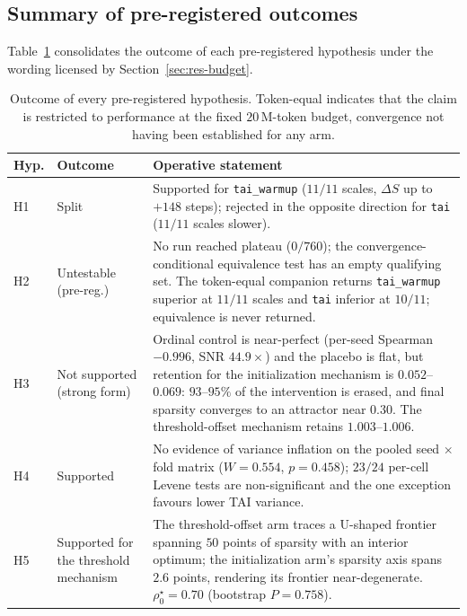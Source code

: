 \documentclass[final,5p,times,twocolumn]{elsarticle}
\theoremstyle{remark}
\newcommand{\rhoz}{\rho_{0}}
\newcommand{\dS}{\Delta S}
\begin{document}
\subsection{Summary of pre-registered outcomes}
\label{sec:res-summary}

Table~\ref{tab:hypsummary} consolidates the outcome of each pre-registered
hypothesis under the wording licensed by Section~\ref{sec:res-budget}.

\begin{table}[t]
\centering
\scriptsize
\caption{Outcome of every pre-registered hypothesis. Token-equal indicates
that the claim is restricted to performance at the fixed $20$\,M-token budget,
convergence not having been established for any arm.}
\label{tab:hypsummary}
\begin{tabular}{@{}p{0.9cm}p{2.7cm}p{6.1cm}@{}}
\toprule
Hyp. & Outcome & Operative statement \\
\midrule
H1 & Split &
Supported for \texttt{tai\_warmup} ($11/11$ scales, $\dS$ up to $+148$ steps);
rejected in the opposite direction for \texttt{tai} ($11/11$ scales slower). \\
\addlinespace
H2 & Untestable (pre-reg.) &
No run reached plateau ($0/760$); the convergence-conditional equivalence test
has an empty qualifying set. The token-equal companion returns
\texttt{tai\_warmup} superior at $11/11$ scales and \texttt{tai} inferior at
$10/11$; equivalence is never returned. \\
\addlinespace
H3 & Not supported (strong form) &
Ordinal control is near-perfect (per-seed Spearman $-0.996$, SNR $44.9\times$)
and the placebo is flat, but retention for the initialization mechanism is
$0.052$--$0.069$: $93$--$95\%$ of the intervention is erased, and final
sparsity converges to an attractor near $0.30$. The threshold-offset mechanism
retains $1.003$--$1.006$. \\
\addlinespace
H4 & Supported &
No evidence of variance inflation on the pooled seed $\times$ fold matrix
($W = 0.554$, $p = 0.458$); $23/24$ per-cell Levene tests are non-significant
and the one exception favours lower TAI variance. \\
\addlinespace
H5 & Supported for the threshold mechanism &
The threshold-offset arm traces a U-shaped frontier spanning $50$ points of
sparsity with an interior optimum; the initialization arm's sparsity axis spans
$2.6$ points, rendering its frontier near-degenerate.
$\rhoz^\star = 0.70$ (bootstrap $P = 0.758$). \\

\end{tabular}
\end{table}
\end{document}
